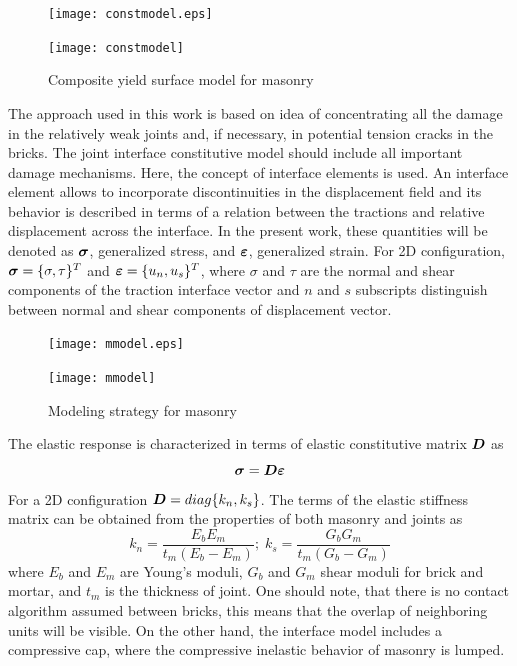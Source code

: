 \documentclass[a4paper]{article}
\newcommand{\mbf}[1]{\mbox{\boldmath$#1$}}
\newcommand{\del}[2]{\mbox{$\displaystyle\frac{#1}{#2}$}}
\newcommand{\e}{\mbf{\varepsilon}}
\newcommand{\sig}{\mbf{\sigma}}
\begin{document}
\begin{figure}[!htb]
\begin{htmlonly}
  \centerline{\texttt{[image: constmodel.eps]}}
\end{htmlonly}
 \centerline{\texttt{[image: constmodel]}}
  \caption{Composite yield surface model for masonry}
  \label{compyieldsurffig}
\end{figure}


The approach used in this work is based on idea of concentrating all the damage in the relatively weak joints and, if necessary, in potential tension cracks in the bricks. The joint interface constitutive model should include all important damage mechanisms. Here, the  concept of interface elements is used. An interface element allows to incorporate discontinuities in the displacement field and its behavior is described in terms of a relation between the tractions and relative displacement across the interface. In the present work, these quantities will be denoted as $\sig$, generalized stress, and $\e$, generalized strain. For 2D configuration, $\sig=\{\sigma, \tau\}^T$ and $\e=\{u_n, u_s\}^T$, where $\sigma$ and $\tau$ are the normal and shear components of the traction interface vector and  $n$ and $s$ subscripts distinguish between normal and shear components of displacement vector.
\begin{figure}[!htb]
\begin{htmlonly}
  \centerline{\texttt{[image: mmodel.eps]}}
\end{htmlonly}
 \centerline{\texttt{[image: mmodel]}}
  \caption{Modeling strategy for masonry}
\end{figure}
The elastic response is characterized in terms of elastic constitutive matrix $\mbf{D}$ as
\begin{equation}
  \sig=\mbf{D}\e
\end{equation}
For a 2D configuration $\mbf{D}=diag\{k_n,k_s\}$. The terms of the elastic stiffness matrix can be obtained from the properties of both masonry and joints as
\begin{equation}
  k_n=\del{E_bE_m}{t_m(E_b-E_m)};\;k_s=\del{G_bG_m}{t_m(G_b-G_m)}
\end{equation}
where $E_b$ and $E_m$ are Young's moduli, $G_b$ and $G_m$ shear moduli for brick and mortar, and $t_m$ is the thickness of joint. One should note, that there is no contact algorithm assumed between bricks, this means that the overlap of neighboring units will be visible. On the other hand, the interface model includes a compressive cap, where the compressive inelastic behavior of masonry is lumped.
\end{document}
